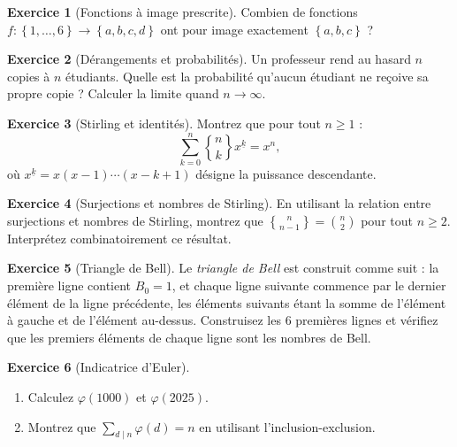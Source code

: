 \documentclass[12pt,a4paper,openany]{book}
\theoremstyle{definition}
\newtheorem{exercice}{Exercice}[chapter]
\theoremstyle{plain}
\theoremstyle{remark}
\newcommand{\set}[1]{\left\{#1\right\}}
\begin{document}
\begin{exercice}[Fonctions à image prescrite]
\label{exo:fonctions-image}
Combien de fonctions $f : \set{1,\dots,6} \to \set{a,b,c,d}$ ont pour image
exactement $\set{a,b,c}$ ?
\end{exercice}

\begin{exercice}[Dérangements et probabilités]
\label{exo:derangement-proba}
Un professeur rend au hasard $n$ copies à $n$ étudiants. Quelle est la probabilité
qu'aucun étudiant ne reçoive sa propre copie ? Calculer la limite quand $n \to \infty$.
\end{exercice}

\begin{exercice}[Stirling et identités]
\label{exo:stirling-id}
Montrez que pour tout $n \geqslant 1$ :
\[
  \sum_{k=0}^{n} \genfrac{\{}{\}}{0pt}{}{n}{k} x^{\underline{k}} = x^n,
\]
où $x^{\underline{k}} = x(x-1)\cdots(x-k+1)$ désigne la puissance descendante.
\end{exercice}

\begin{exercice}[Surjections et nombres de Stirling]
\label{exo:surj-stirling}
En utilisant la relation entre surjections et nombres de Stirling, montrez que
$\genfrac{\{}{\}}{0pt}{}{n}{n-1} = \binom{n}{2}$ pour tout $n \geqslant 2$.
Interprétez combinatoirement ce résultat.
\end{exercice}

\begin{exercice}[Triangle de Bell]
\label{exo:triangle-bell}
Le \emph{triangle de Bell} est construit comme suit :
la première ligne contient $B_0 = 1$, et chaque ligne suivante commence par
le dernier élément de la ligne précédente, les éléments suivants étant la somme
de l'élément à gauche et de l'élément au-dessus. Construisez les $6$ premières
lignes et vérifiez que les premiers éléments de chaque ligne sont les nombres de Bell.
\end{exercice}

\begin{exercice}[Indicatrice d'Euler]
\label{exo:euler-totient}
\begin{enumerate}[label=\alph*)]
  \item Calculez $\varphi(1000)$ et $\varphi(2025)$.
  \item Montrez que $\sum_{d \mid n} \varphi(d) = n$ en utilisant
    l'inclusion-exclusion.
\end{enumerate}
\end{exercice}
\end{document}
